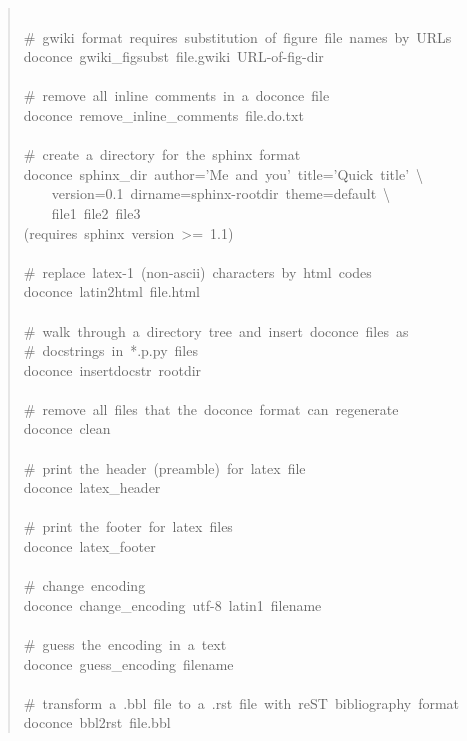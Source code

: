 \documentclass[a4paper]{article}
\begin{document}
\begin{quote}
{~\\
\#~gwiki~format~requires~substitution~of~figure~file~names~by~URLs\\
doconce~gwiki\_figsubst~file.gwiki~URL-of-fig-dir\\
~\\
\#~remove~all~inline~comments~in~a~doconce~file\\
doconce~remove\_inline\_comments~file.do.txt\\
~\\
\#~create~a~directory~for~the~sphinx~format\\
doconce~sphinx\_dir~author='Me~and~you'~title='Quick~title'~\textbackslash{}\\
~~~~version=0.1~dirname=sphinx-rootdir~theme=default~\textbackslash{}\\
~~~~file1~file2~file3\\
(requires~sphinx~version~>=~1.1)\\
~\\
\#~replace~latex-1~(non-ascii)~characters~by~html~codes\\
doconce~latin2html~file.html\\
~\\
\#~walk~through~a~directory~tree~and~insert~doconce~files~as\\
\#~docstrings~in~*.p.py~files\\
doconce~insertdocstr~rootdir\\
~\\
\#~remove~all~files~that~the~doconce~format~can~regenerate\\
doconce~clean\\
~\\
\#~print~the~header~(preamble)~for~latex~file\\
doconce~latex\_header\\
~\\
\#~print~the~footer~for~latex~files\\
doconce~latex\_footer\\
~\\
\#~change~encoding\\
doconce~change\_encoding~utf-8~latin1~filename\\
~\\
\#~guess~the~encoding~in~a~text\\
doconce~guess\_encoding~filename\\
~\\
\#~transform~a~.bbl~file~to~a~.rst~file~with~reST~bibliography~format\\
doconce~bbl2rst~file.bbl\\
}
\end{quote}
\end{document}
